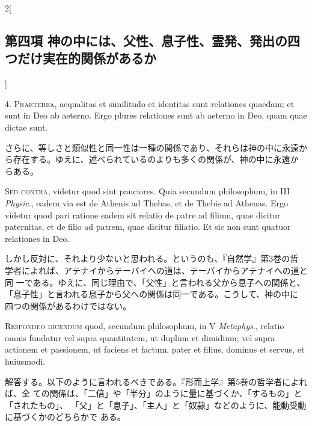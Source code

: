 \documentclass[paper=a4paper,fontsize=10pt,jafontsize=9pt,titlepage]{jlreq}
\begin{document}
\begin{paracol}{2}[\subsection{第四項 神の中には、父性、息子性、霊発、発出の四つだけ実在的関係があるか}]


4. {\scshape Praeterea}, aequalitas et similitudo et identitas sunt relationes
quaedam; et sunt in Deo ab aeterno. Ergo plures relationes sunt ab
aeterno in Deo, quam quae dictae sunt.


\switchcolumn


さらに、等しさと類似性と同一性は一種の関係であり、それらは神の中に永遠か
 ら存在する。ゆえに、述べられているのよりも多くの関係が、神の中に永遠か
 らある。


\switchcolumn*[\subsection{s.c.}]


{\scshape Sed contra}, videtur quod sint pauciores. Quia secundum philosophum,
in III {\itshape Physic}., eadem via est de Athenis ad Thebas, et de Thebis ad
Athenas. Ergo videtur quod pari ratione eadem sit relatio de patre ad filium,
quae dicitur paternitas, et de filio ad patrem, quae dicitur filiatio. Et sic
non sunt quatuor relationes in Deo.


\switchcolumn


しかし反対に、それより少ないと思われる。というのも、『自然学』第3巻の哲
 学者によれば、アテナイからテーバイへの道は、テーバイからアテナイへの道と同
 一である。ゆえに、同じ理由で、「父性」と言われる父から息子への関係と、
 「息子性」と言われる息子から父への関係は同一である。こうして、神の中に
 四つの関係があるわけではない。




{\scshape Respondeo dicendum} quod, secundum philosophum, 
in V {\itshape Metaphys}., relatio
omnis fundatur vel supra quantitatem, ut duplum et dimidium; vel supra
actionem et passionem, ut faciens et factum, pater et filius, dominus et
servus, et huiusmodi.


\switchcolumn


解答する。以下のように言われるべきである。『形而上学』第5巻の哲学者によれば、全
ての関係は、「二倍」や「半分」のように量に基づくか、「するもの」と「されたもの」、
「父」と「息子」、「主人」と「奴隷」などのように、能動受動に基づくかのどちらかで
ある。



\end{paracol}
\end{document}
